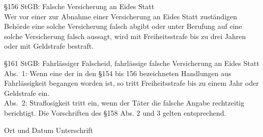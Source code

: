 \vspace{0.2cm}
\noindent
\S 156 StGB: Falsche Versicherung an Eides Statt \\
Wer vor einer zur Abnahme einer Versicherung an Eides Statt
zust\"andigen Beh\"orde eine solche Versicherung falsch abgibt oder unter
Berufung auf eine solche Versicherung falsch aussagt, wird mit
Freiheitsstrafe bis zu drei Jahren oder mit Geldstrafe bestraft.

\vspace{0.2cm}
\noindent
\S 161 StGB: Fahrl\"assiger Falscheid, fahrl\"assige falsche Versicherung
an Eides Statt \\
Abs.~1: Wenn eine der in den \S154 bis 156 bezeichneten Handlungen aus
Fahrl\"assigkeit begangen worden ist, so tritt
Freiheitsstrafe bis zu einem Jahr oder Geldstrafe ein. \\
Abs.~2: Straflosigkeit tritt ein, wenn der T\"ater die falsche Angabe
rechtzeitig berichtigt. Die Vorschriften des \S158 Abs. 2 und 3 gelten
entsprechend.

\vspace{1cm}

\noindent Ort und Datum \hspace{5cm} Unterschrift


